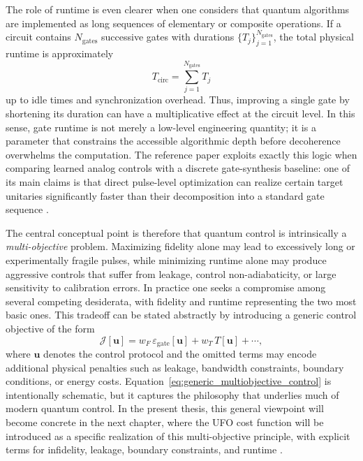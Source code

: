 The role of runtime is even clearer when one considers that quantum algorithms are implemented as long sequences of elementary or composite operations. If a circuit contains $N_{\mathrm{gates}}$ successive gates with durations $\{T_j\}_{j=1}^{N_{\mathrm{gates}}}$, the total physical runtime is approximately
\begin{equation}
T_{\mathrm{circ}}
=
\sum_{j=1}^{N_{\mathrm{gates}}} T_j
\label{eq:total_circuit_runtime}
\end{equation}
up to idle times and synchronization overhead. Thus, improving a single gate by shortening its duration can have a multiplicative effect at the circuit level. In this sense, gate runtime is not merely a low-level engineering quantity; it is a parameter that constrains the accessible algorithmic depth before decoherence overwhelms the computation. The reference paper exploits exactly this logic when comparing learned analog controls with a discrete gate-synthesis baseline: one of its main claims is that direct pulse-level optimization can realize certain target unitaries significantly faster than their decomposition into a standard gate sequence \cite{Niu2019}.

The central conceptual point is therefore that quantum control is intrinsically a \emph{multi-objective} problem. Maximizing fidelity alone may lead to excessively long or experimentally fragile pulses, while minimizing runtime alone may produce aggressive controls that suffer from leakage, control non-adiabaticity, or large sensitivity to calibration errors. In practice one seeks a compromise among several competing desiderata, with fidelity and runtime representing the two most basic ones. This tradeoff can be stated abstractly by introducing a generic control objective of the form
\begin{equation}
\mathcal{J}[\bm{u}]
=
w_{F}\,\varepsilon_{\mathrm{gate}}[\bm{u}]
+
w_{T}\,T[\bm{u}]
+
\cdots,
\label{eq:generic_multiobjective_control}
\end{equation}
where $\bm{u}$ denotes the control protocol and the omitted terms may encode additional physical penalties such as leakage, bandwidth constraints, boundary conditions, or energy costs. Equation~\eqref{eq:generic_multiobjective_control} is intentionally schematic, but it captures the philosophy that underlies much of modern quantum control. In the present thesis, this general viewpoint will become concrete in the next chapter, where the UFO cost function will be introduced as a specific realization of this multi-objective principle, with explicit terms for infidelity, leakage, boundary constraints, and runtime \cite{Niu2019}.

